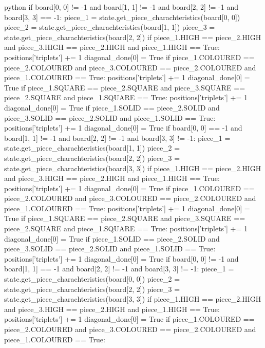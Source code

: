 \begin{mintedbox}{python}
    if board[0, 0] != -1 and board[1, 1] != -1 and board[2, 2] != -1 and board[3, 3] == -1:
        piece_1 = state.get_piece_charachteristics(board[0, 0])
        piece_2 = state.get_piece_charachteristics(board[1, 1])
        piece_3 = state.get_piece_charachteristics(board[2, 2])
        if piece_1.HIGH == piece_2.HIGH and piece_3.HIGH == piece_2.HIGH and piece_1.HIGH == True:
            positions['triplets'] += 1
            diagonal_done[0] = True
        if piece_1.COLOURED == piece_2.COLOURED and piece_3.COLOURED == piece_2.COLOURED and piece_1.COLOURED == True:
            positions['triplets'] += 1
            diagonal_done[0] = True
        if piece_1.SQUARE == piece_2.SQUARE and piece_3.SQUARE == piece_2.SQUARE and piece_1.SQUARE == True:
            positions['triplets'] += 1
            diagonal_done[0] = True
        if piece_1.SOLID == piece_2.SOLID and piece_3.SOLID == piece_2.SOLID and piece_1.SOLID == True:
            positions['triplets'] += 1
            diagonal_done[0] = True
    if board[0, 0] == -1 and board[1, 1] != -1 and board[2, 2] != -1 and board[3, 3] != -1:
        piece_1 = state.get_piece_charachteristics(board[1, 1])
        piece_2 = state.get_piece_charachteristics(board[2, 2])
        piece_3 = state.get_piece_charachteristics(board[3, 3])
        if piece_1.HIGH == piece_2.HIGH and piece_3.HIGH == piece_2.HIGH and piece_1.HIGH == True:
            positions['triplets'] += 1
            diagonal_done[0] = True
        if piece_1.COLOURED == piece_2.COLOURED and piece_3.COLOURED == piece_2.COLOURED and piece_1.COLOURED == True:
            positions['triplets'] += 1
            diagonal_done[0] = True
        if piece_1.SQUARE == piece_2.SQUARE and piece_3.SQUARE == piece_2.SQUARE and piece_1.SQUARE == True:
            positions['triplets'] += 1
            diagonal_done[0] = True
        if piece_1.SOLID == piece_2.SOLID and piece_3.SOLID == piece_2.SOLID and piece_1.SOLID == True:
            positions['triplets'] += 1
            diagonal_done[0] = True
    if board[0, 0] != -1 and board[1, 1] == -1 and board[2, 2] != -1 and board[3, 3] != -1:
        piece_1 = state.get_piece_charachteristics(board[0, 0])
        piece_2 = state.get_piece_charachteristics(board[2, 2])
        piece_3 = state.get_piece_charachteristics(board[3, 3])
        if piece_1.HIGH == piece_2.HIGH and piece_3.HIGH == piece_2.HIGH and piece_1.HIGH == True:
            positions['triplets'] += 1
            diagonal_done[0] = True
        if piece_1.COLOURED == piece_2.COLOURED and piece_3.COLOURED == piece_2.COLOURED and piece_1.COLOURED == True:

\end{mintedbox}
